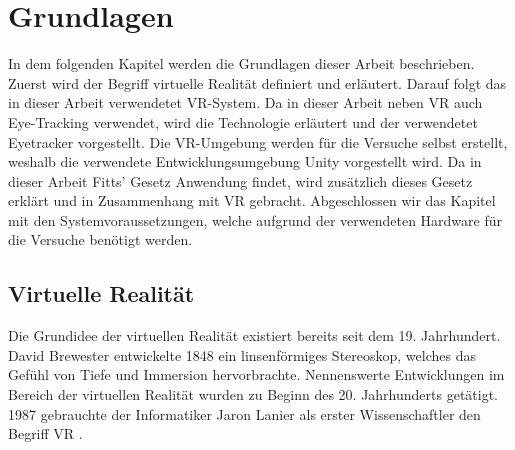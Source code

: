 
\chapter{Grundlagen}
In dem folgenden Kapitel werden die Grundlagen dieser Arbeit beschrieben. Zuerst wird der Begriff virtuelle Realität definiert und erläutert. Darauf folgt das in dieser Arbeit verwendetet \ac{VR}-System. Da in dieser Arbeit neben \ac{VR} auch Eye-Tracking verwendet, wird die Technologie erläutert und der verwendetet Eyetracker vorgestellt. Die \ac{VR}-Umgebung werden für die Versuche selbst erstellt, weshalb die verwendete Entwicklungsumgebung Unity vorgestellt wird. Da in dieser Arbeit Fitts' Gesetz Anwendung findet, wird zusätzlich dieses Gesetz erklärt und in Zusammenhang mit \ac{VR} gebracht. Abgeschlossen wir das Kapitel mit den Systemvoraussetzungen, welche aufgrund der verwendeten Hardware für die Versuche benötigt werden.

\section{Virtuelle Realität}
Die Grundidee der virtuellen Realität existiert bereits seit dem 19. Jahrhundert. David Brewester entwickelte 1848 ein linsenförmiges Stereoskop, welches das Gefühl von Tiefe und Immersion hervorbrachte. Nennenswerte Entwicklungen im Bereich der virtuellen Realität wurden zu Beginn des 20. Jahrhunderts getätigt. \cite{Singh.2017} 1987 gebrauchte der Informatiker Jaron Lanier als erster Wissenschaftler den Begriff \ac{VR} \cite{Doerner2019}. 

